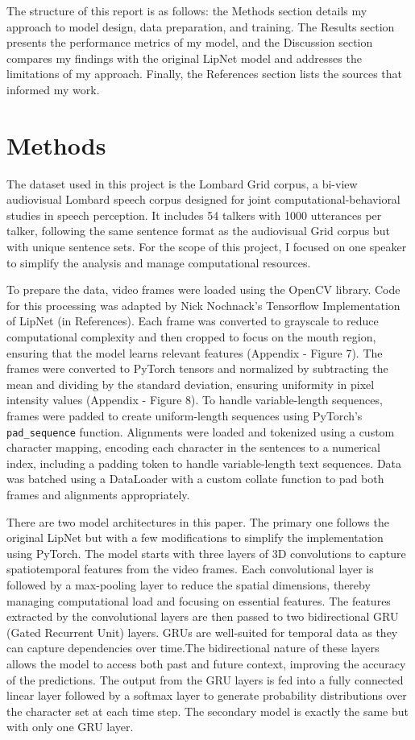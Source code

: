 \documentclass[
]{article}
\begin{document}
The structure of this report is as follows: the Methods section details
my approach to model design, data preparation, and training. The Results
section presents the performance metrics of my model, and the Discussion
section compares my findings with the original LipNet model and
addresses the limitations of my approach. Finally, the References
section lists the sources that informed my work.

\section{Methods}\label{methods}

The dataset used in this project is the Lombard Grid corpus, a bi-view
audiovisual Lombard speech corpus designed for joint
computational-behavioral studies in speech perception. It includes 54
talkers with 1000 utterances per talker, following the same sentence
format as the audiovisual Grid corpus but with unique sentence sets. For
the scope of this project, I focused on one speaker to simplify the
analysis and manage computational resources.

To prepare the data, video frames were loaded using the OpenCV library.
Code for this processing was adapted by Nick Nochnack's Tensorflow
Implementation of LipNet (in References). Each frame was converted to
grayscale to reduce computational complexity and then cropped to focus
on the mouth region, ensuring that the model learns relevant features
(Appendix - Figure 7). The frames were converted to PyTorch tensors and
normalized by subtracting the mean and dividing by the standard
deviation, ensuring uniformity in pixel intensity values (Appendix -
Figure 8). To handle variable-length sequences, frames were padded to
create uniform-length sequences using PyTorch's \texttt{pad\_sequence}
function. Alignments were loaded and tokenized using a custom character
mapping, encoding each character in the sentences to a numerical index,
including a padding token to handle variable-length text sequences. Data
was batched using a DataLoader with a custom collate function to pad
both frames and alignments appropriately.

There are two model architectures in this paper. The primary one follows
the original LipNet but with a few modifications to simplify the
implementation using PyTorch. The model starts with three layers of 3D
convolutions to capture spatiotemporal features from the video frames.
Each convolutional layer is followed by a max-pooling layer to reduce
the spatial dimensions, thereby managing computational load and focusing
on essential features. The features extracted by the convolutional
layers are then passed to two bidirectional GRU (Gated Recurrent Unit)
layers. GRUs are well-suited for temporal data as they can capture
dependencies over time.The bidirectional nature of these layers allows
the model to access both past and future context, improving the accuracy
of the predictions. The output from the GRU layers is fed into a fully
connected linear layer followed by a softmax layer to generate
probability distributions over the character set at each time step. The
secondary model is exactly the same but with only one GRU layer.
\end{document}
